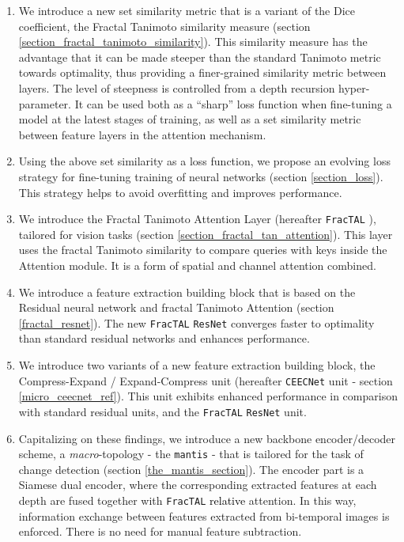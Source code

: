 \documentclass[times, 5p]{elsarticle}
\def \FracTAL {\texttt{FracTAL} }
\newcommand{\ceecnet}{\texttt{CEECNet}}
\begin{document}
\begin{enumerate}
\item
We introduce a new set similarity metric that is a variant
of the Dice coefficient, the Fractal Tanimoto similarity measure (section \ref{section_fractal_tanimoto_similarity}). This similarity measure has the advantage
that it can be made steeper than the standard Tanimoto metric towards optimality, thus providing a finer-grained similarity metric between layers.  The level of steepness is controlled from a
depth recursion hyper-parameter. It can be used both as
a ``sharp'' loss function when fine-tuning a model at the
latest stages of training, as well as a set similarity metric
between feature layers in the attention mechanism.
\item Using the above set similarity as a loss function, we propose an evolving loss strategy for fine-tuning training of neural networks (section \ref{section_loss}). This strategy helps to avoid overfitting and improves performance.
\item We introduce the Fractal Tanimoto Attention Layer (hereafter \FracTAL), tailored for vision tasks (section \ref{section_fractal_tan_attention}). This layer uses the fractal Tanimoto similarity to compare queries with keys inside the Attention module. It is a form of spatial and channel attention combined. 
\begin{comment}
One of the many advantages of the \FracTAL is its small memory footpring in comparison with standard approaches \cite[][see also \citealt{DBLP:journals/corr/VaswaniSPUJGKP17}]{DBLP:journals/corr/abs-1904-09925}.
\end{comment} 
\item We introduce a feature extraction building block that is based on the Residual neural network and fractal Tanimoto Attention (section \ref{fractal_resnet}). The new \FracTAL \texttt{ResNet} converges faster to optimality than standard residual networks and enhances performance. 
\item We introduce two variants of a new feature extraction building block, the Compress-Expand / Expand-Compress unit (hereafter \ceecnet{} unit - section \ref{micro_ceecnet_ref}). This unit exhibits enhanced performance in comparison with standard residual units, and the \FracTAL \texttt{ResNet} unit.  
\item  Capitalizing on these findings,  we introduce  a new backbone encoder/decoder scheme, a \emph{macro}-topology - the   \texttt{mantis} - that is tailored for the task of change detection (section \ref{the_mantis_section}). The encoder part is a Siamese dual encoder, where the corresponding extracted features at each depth are fused together with  \FracTAL \textcolor{black}{relative} attention. In this way, information exchange between features extracted from bi-temporal images is enforced. There is no need for manual feature subtraction.  

\end{enumerate}
\end{document}
